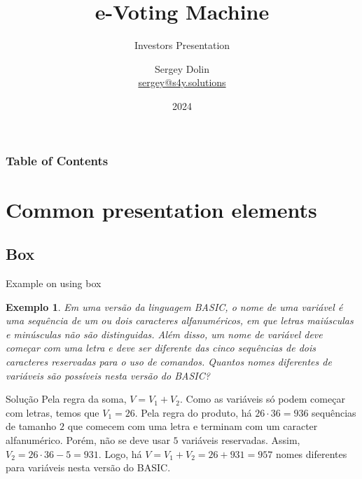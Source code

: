 \documentclass[aspectratio=169,t,xcolor=table]{beamer}
\newtheorem{ex}{Exemplo}
\begin{document}
\title[Inf UFG]{e-Voting Machine}
\subtitle{Investors Presentation}

\author[Sergey Dolin]{Sergey Dolin \\
\href{mailto:sergey@s4y.solutions}{\scriptsize{sergey@s4y.solutions}} \\ }

\date{2024}
\frame[noframenumbering]{\titlepage}



\begin{frame}
    \frametitle{Table of Contents}
    \tableofcontents
\end{frame}


\section{Common presentation elements}

\subsection{Box}

\begin{frame}{Example on using box}

    \footnotesize
    
    \begin{ex}
        Em uma versão da linguagem BASIC, o nome de uma variável é uma sequência de um ou dois caracteres alfanuméricos, em que letras maiúsculas e minúsculas não são distinguidas. Além disso, um nome de variável deve começar com uma letra e deve ser diferente das cinco sequências de dois caracteres reservadas para o uso de comandos. Quantos nomes diferentes de variáveis são possíveis nesta versão do BASIC?
    \end{ex}
    
    \begin{block}{Solução}
        Pela regra da soma, $V=V_1+V_2$. Como as variáveis só podem começar com letras, temos que $V_1=26$. Pela regra do produto, há $26\cdot 36=936$ sequências de tamanho $2$ que comecem com uma letra e terminam com um caracter alfanumérico. Porém, não se deve usar $5$ variáveis reservadas. Assim, $V_2=26\cdot 36-5=931$. Logo, há $V=V_1+V_2 = 26+931=957$ nomes diferentes para variáveis nesta versão do BASIC.
    \end{block}

\end{frame}
\end{document}
